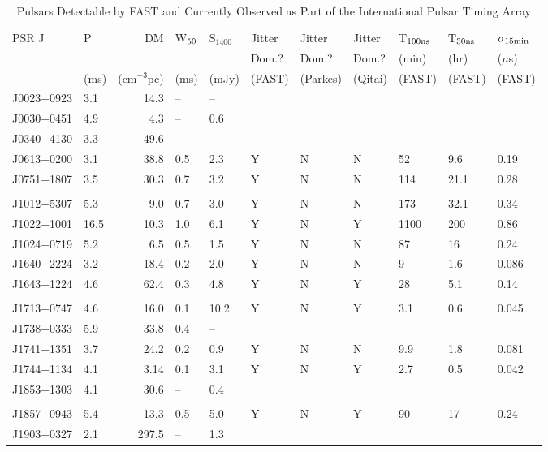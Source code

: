 \documentclass{raa}            %
\begin{document}
\begin{table}
\caption{Pulsars Detectable by FAST and Currently Observed as Part of the International Pulsar Timing Array}\label{tb:fastPsrs}
\begin{tabular}{llrllllllll}
\hline
PSR J & P & DM & W$_{\rm 50}$ & S$_{1400}$ & Jitter & Jitter & Jitter & T$_{100 {\rm ns}}$ & T$_{30 {\rm ns}}$ & $\sigma_{\rm 15 min}$\\
            &     &        &                            &                       & Dom.? & Dom.? & Dom.? & (min) & (hr)  & ($\mu$s)  \\
            & (ms) & (cm$^{-3}$pc) & (ms) & (mJy) & (FAST) & (Parkes)  & (Qitai) & (FAST) & (FAST) & (FAST)\\
\hline
J0023$+$0923 & 3.1 & 14.3 & -- & -- \\
J0030$+$0451 & 4.9 & 4.3 & -- & 0.6  \\
J0340$+$4130 & 3.3 & 49.6 & -- & -- \\
J0613$-$0200 & 3.1 & 38.8 & 0.5 & 2.3 & Y & N & N & 52 & 9.6 & 0.19 \\
J0751$+$1807 & 3.5 & 30.3 & 0.7 & 3.2 & Y & N & N & 114 & 21.1 & 0.28 \\
\\
J1012$+$5307 & 5.3 & 9.0 & 0.7 & 3.0 & Y & N  & N & 173 & 32.1 & 0.34 \\
J1022$+$1001 & 16.5 & 10.3 & 1.0 &  6.1 & Y & N & Y & 1100 & 200 & 0.86 \\
J1024$-$0719 & 5.2 & 6.5 & 0.5 & 1.5 & Y & N & N & 87 & 16 & 0.24 \\
J1640$+$2224 & 3.2 & 18.4 & 0.2 & 2.0 & Y & N & N & 9 & 1.6 & 0.086 \\
J1643$-$1224 & 4.6 & 62.4 & 0.3 & 4.8 & Y & N & Y & 28 & 5.1 & 0.14 \\
\\
J1713$+$0747 & 4.6 & 16.0 & 0.1 & 10.2 & Y & N & Y & 3.1 & 0.6 & 0.045 \\
J1738$+$0333 & 5.9 & 33.8 & 0.4 & -- & \\
J1741$+$1351 & 3.7 & 24.2 & 0.2 & 0.9 & Y & N & N & 9.9 & 1.8 & 0.081  \\
J1744$-$1134 & 4.1 & 3.14 & 0.1 & 3.1 & Y & N & Y & 2.7 & 0.5 & 0.042 \\
J1853$+$1303 & 4.1 & 30.6 & -- & 0.4 \\
\\
J1857$+$0943 & 5.4 & 13.3 & 0.5 & 5.0 & Y & N & Y & 90 & 17 & 0.24 \\
J1903$+$0327 & 2.1 & 297.5 & -- & 1.3 \\

\end{tabular}
\end{table}
\end{document}

